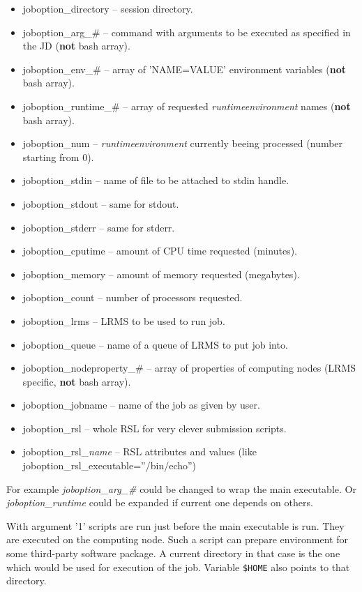 \documentclass{article}                            %
\begin{document}
\begin{itemize}
\item joboption\_directory -- session directory.
\item joboption\_arg\_\# -- command with arguments to be executed as specified
in the JD (\textbf{not} bash array).
\item joboption\_env\_\# -- array of 'NAME=VALUE' environment variables (\textbf{not}
bash array).
\item joboption\_runtime\_\# -- array of requested \emph{runtimeenvironment}
names (\textbf{not} bash array).
\item joboption\_num -- \emph{runtimeenvironment} currently beeing processed
(number starting from 0).
\item joboption\_stdin -- name of file to be attached to stdin handle.
\item joboption\_stdout -- same for stdout.
\item joboption\_stderr -- same for stderr.
\item joboption\_cputime -- amount of CPU time requested (minutes).
\item joboption\_memory -- amount of memory requested (megabytes).
\item joboption\_count -- number of processors requested.
\item joboption\_lrms -- LRMS to be used to run job.
\item joboption\_queue -- name of a queue of LRMS to put job into.
\item joboption\_nodeproperty\_\# -- array of properties of computing nodes
(LRMS specific, \textbf{not} bash array).
\item joboption\_jobname -- name of the job as given by user.
\item joboption\_rsl -- whole RSL for very clever submission scripts.
\item joboption\_rsl\_\emph{name} -- RSL attributes and values (like joboption\_rsl\_executable=''/bin/echo'')
\end{itemize}

For example \emph{joboption\_arg\_\#} could be changed to wrap the main
executable. Or \emph{joboption\_runtime} could be expanded if current
one depends on others.

With argument '1' scripts are run just before the main executable is run.
They are executed on the computing node. Such a script can prepare environment
for some third-party software package. A current directory in that
case is the one which would be used for execution of the job. Variable \verb|$HOME|
also points to that directory.
\end{document}
